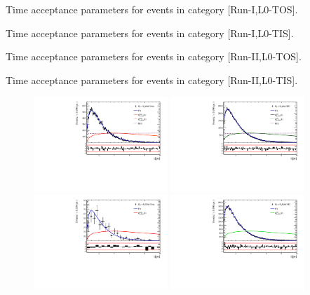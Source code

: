 \begin{table}[h]
\centering
\scriptsize
\caption{Time acceptance parameters for events in category [\textsf{Run-I},\textsf{L0-TOS}].}

\label{table:splines}
\caption{Time acceptance parameters for events in category [\textsf{Run-I},\textsf{L0-TIS}].}

\caption{Time acceptance parameters for events in category [\textsf{Run-II},\textsf{L0-TOS}].}

\caption{Time acceptance parameters for events in category [\textsf{Run-II},\textsf{L0-TIS}].}

\label{table:splines4}
\end{table}

\clearpage
\begin{figure}[h]
\centering
\includegraphics[height=!,width=0.45\textwidth]{figs/Acceptance/adaptive_N4/timeAccRatioFit_norm_Run1_t0.pdf}
\includegraphics[height=!,width=0.45\textwidth]{figs/Acceptance/adaptive_N4/timeAccRatioFit_norm_mc_Run1_t0.pdf}
\includegraphics[height=!,width=0.45\textwidth]{figs/Acceptance/adaptive_N4/timeAccRatioFit_signal_B0_Run1_t0.pdf}
\includegraphics[height=!,width=0.45\textwidth]{figs/Acceptance/adaptive_N4/timeAccRatioFit_signal_mc_Run1_t0.pdf}

\end{figure}
